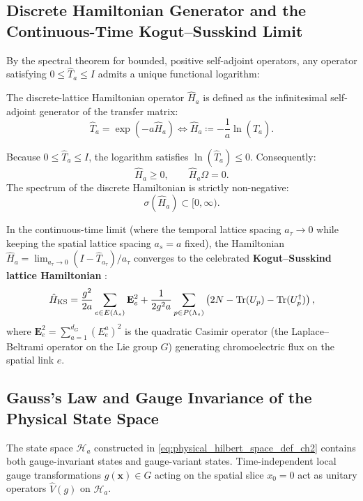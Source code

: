 \subsection{Discrete Hamiltonian Generator and the Continuous-Time Kogut--Susskind Limit}
\label{subsec:hamiltonian_generator}
By the spectral theorem for bounded, positive self-adjoint operators, any operator satisfying $0 \le \hat{T}_a \le I$ admits a unique functional logarithm:
\begin{definition}
The discrete-lattice Hamiltonian operator $\hat{H}_a$ is defined as the infinitesimal self-adjoint generator of the transfer matrix:
\begin{equation}
\label{eq:discrete_hamiltonian_def}
\hat{T}_a = \exp( -a \hat{H}_a ) \iff \hat{H}_a \coloneqq -\frac{1}{a} \ln(\hat{T}_a).
\end{equation}
\end{definition}
Because $0 \le \hat{T}_a \le I$, the logarithm satisfies $\ln(\hat{T}_a) \le 0$. Consequently:
\begin{equation}
\hat{H}_a \ge 0, \qquad \hat{H}_a \Omega = 0.
\end{equation}
The spectrum of the discrete Hamiltonian is strictly non-negative:
\begin{equation}
\sigma(\hat{H}_a) \subset [0, \infty).
\end{equation}

In the continuous-time limit (where the temporal lattice spacing $a_\tau \to 0$ while keeping the spatial lattice spacing $a_s = a$ fixed), the Hamiltonian $\hat{H}_a = \lim_{a_\tau \to 0} (I - \hat{T}_{a_\tau})/a_\tau$ converges to the celebrated \textbf{Kogut--Susskind lattice Hamiltonian} \cite{LuciniTeper2001}:
\begin{equation}
\label{eq:kogut_susskind_hamiltonian}
\hat{H}_{\mathrm{KS}} = \frac{g^2}{2a} \sum_{e \in E(\Lambda_s)} \mathbf{E}_e^2 + \frac{1}{2g^2 a} \sum_{p \in P(\Lambda_s)} \left( 2N - \mathrm{Tr}(U_p) - \mathrm{Tr}(U_p^\dagger) \right),
\end{equation}
where $\mathbf{E}_e^2 = \sum_{a=1}^{d_G} (E_e^a)^2$ is the quadratic Casimir operator (the Laplace--Beltrami operator on the Lie group $G$) generating chromoelectric flux on the spatial link $e$.

\subsection{Gauss's Law and Gauge Invariance of the Physical State Space}
\label{subsec:gauss_law_physical}
The state space $\mathcal{H}_a$ constructed in \eqref{eq:physical_hilbert_space_def_ch2} contains both gauge-invariant states and gauge-variant states. Time-independent local gauge transformations $g(\mathbf{x}) \in G$ acting on the spatial slice $x_0 = 0$ act as unitary operators $\hat{V}(g)$ on $\mathcal{H}_a$.

